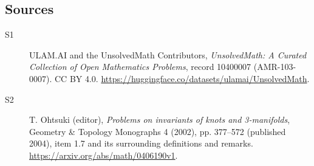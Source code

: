 \documentclass[11pt]{article}
\begin{document}
\subsection{Sources}
\begin{description}
\item[\hypertarget{source:10400007:1}{S1}] ULAM.AI and the UnsolvedMath Contributors, \emph{UnsolvedMath: A Curated Collection of Open Mathematics Problems}, record 10400007 (AMR-103-0007). CC BY 4.0. \url{https://huggingface.co/datasets/ulamai/UnsolvedMath}.
\item[\hypertarget{source:10400007:2}{S2}] T. Ohtsuki (editor), \emph{Problems on invariants of knots and 3-manifolds}, Geometry \& Topology Monographs 4 (2002), pp. 377--572 (published 2004), item 1.7 and its surrounding definitions and remarks. \url{https://arxiv.org/abs/math/0406190v1}.
\end{description}
\label{end:10400007}
\end{document}
